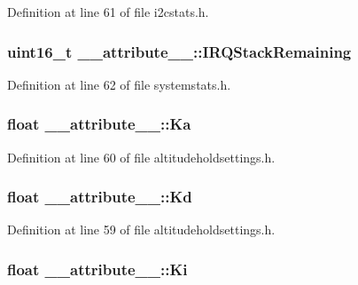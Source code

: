 \-Definition at line 61 of file i2cstats.\-h.

\hypertarget{struct____attribute_____abc3746c957b98a7cbf5ee32f39c80549}{
\subsubsection[{\-I\-R\-Q\-Stack\-Remaining}]{\setlength{\rightskip}{0pt plus 5cm}uint16\-\_\-t {\bf \-\_\-\-\_\-attribute\-\_\-\-\_\-\-::\-I\-R\-Q\-Stack\-Remaining}}}\label{struct____attribute_____abc3746c957b98a7cbf5ee32f39c80549}


\-Definition at line 62 of file systemstats.\-h.

\hypertarget{struct____attribute_____ade6c290f80f7ebc6514ea09001d9770b}{
\subsubsection[{\-Ka}]{\setlength{\rightskip}{0pt plus 5cm}float {\bf \-\_\-\-\_\-attribute\-\_\-\-\_\-\-::\-Ka}}}\label{struct____attribute_____ade6c290f80f7ebc6514ea09001d9770b}


\-Definition at line 60 of file altitudeholdsettings.\-h.

\hypertarget{struct____attribute_____ab6bf02cf758b5831d3f48560a7c7a626}{
\subsubsection[{\-Kd}]{\setlength{\rightskip}{0pt plus 5cm}float {\bf \-\_\-\-\_\-attribute\-\_\-\-\_\-\-::\-Kd}}}\label{struct____attribute_____ab6bf02cf758b5831d3f48560a7c7a626}


\-Definition at line 59 of file altitudeholdsettings.\-h.

\hypertarget{struct____attribute_____a2a28be37b896ead959f6ba8d73844008}{
\subsubsection[{\-Ki}]{\setlength{\rightskip}{0pt plus 5cm}float {\bf \-\_\-\-\_\-attribute\-\_\-\-\_\-\-::\-Ki}}}\label{struct____attribute_____a2a28be37b896ead959f6ba8d73844008}


